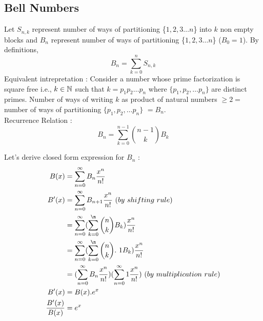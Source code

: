 \begin{parts}
\subsection{Bell Numbers}
Let $S_{n,k}$ represent number of ways of partitioning \{$1, 2 ,3 \dots n $\} into $k$ non empty blocks and $B_n$ represent number of ways of partitioning \{$1, 2 ,3 \dots n $\} ($B_0 = 1$). By definitions, 
$$B_n = \sum_{k=0}^n S_{n,k}$$
Equivalent intrepretation :  Consider a number whose prime factorization is square free i.e., $k \in \mathbb{N}$ such that $k = p_1p_2 \dots p_n$ where $\{p_1, p_2, \dots p_n\}$ are distinct primes. Number of ways of writing $k$ as product of natural numbers $\geq 2 = $ number of ways of partitioning  $\{p_1, p_2, \dots p_n\}$  $= B_n$. \\
Recurrence Relation : 
 $$ B_n = \sum_{k=0}^{n-1} {{n-1} \choose k} B_k $$ 
 \end{parts}
 Let's derive closed form expression for $B_n$ :
 \begin{align*}
     B(x) &= \sum_{n=0}^{\infty} B_n \frac{x^n}{n!} \\
     B'(x) &= \sum_{n=0}^{\infty} B_{n+1} \frac{x^n}{n!} ~(by ~ shifting ~rule) \\
     &= \sum_{n=0}^{\infty} (\sum_{k=0}^{\n} {n \choose k} B_k) \frac{x^n}{n!} \\
     &= \sum_{n=0}^{\infty} (\sum_{k=0}^{\n} {n \choose k}. ~1 B_k) \frac{x^n}{n!} \\
     &= (\sum_{n=0}^{\infty} B_n \frac{x^n}{n!})(\sum_{n=0}^{\infty} 1 \frac{x^n}{n!}) ~(by ~ multiplication ~rule) \\
     B'(x) &= B(x) . e^x \\
     \frac{B'(x)}{B(x)} &= e^x
 \end{align*}
